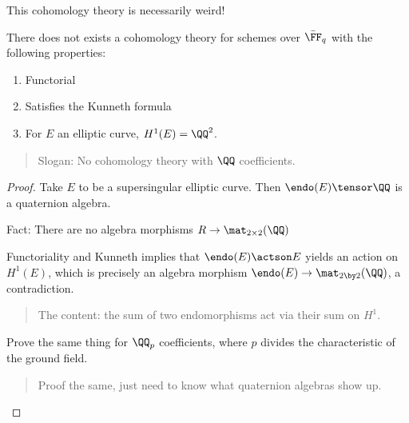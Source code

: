 \begin{remark}

This cohomology theory is necessarily weird!

\begin{theorem}[Serre]

There does not exists a cohomology theory for schemes over
\(\bar{\FF}_q\) with the following properties:

\begin{enumerate}
\def\labelenumi{\arabic{enumi}.}
\tightlist
\item
  Functorial
\item
  Satisfies the Kunneth formula
\item
  For \(E\) an elliptic curve, \(H^1(E) = \QQ^2\).
\end{enumerate}

\begin{quote}
Slogan: No cohomology theory with \(\QQ\) coefficients.
\end{quote}

\end{theorem}

\begin{proof}

Take \(E\) to be a supersingular elliptic curve. Then
\(\endo(E) \tensor \QQ\) is a quaternion algebra.

Fact: There are no algebra morphisms \(R\to \mat_{2\times 2}(\QQ)\)

\begin{exercise}

Functoriality and Kunneth implies that \(\endo(E)\actson E\) yields an
action on \(H^1(E)\), which is precisely an algebra morphism
\(\endo(E) \to \mat_{2\by 2}(\QQ)\), a contradiction.

\begin{quote}
The content: the sum of two endomorphisms act via their sum on \(H^1\).
\end{quote}

\end{exercise}

\begin{exercise}

Prove the same thing for \(\QQ_p\) coefficients, where \(p\) divides the
characteristic of the ground field.

\begin{quote}
Proof the same, just need to know what quaternion algebras show up.
\end{quote}

\end{exercise}

\end{proof}

\end{remark}

